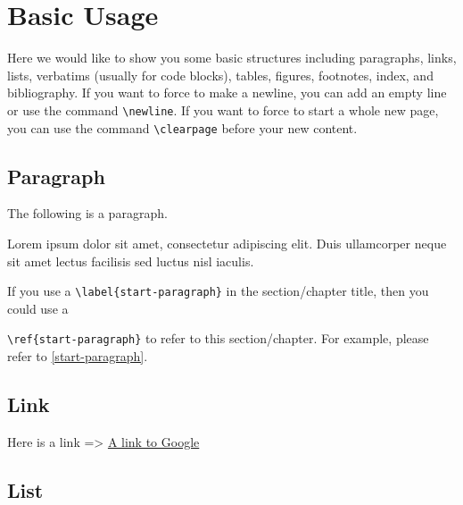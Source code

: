 \documentclass[10pt, a4paper, oneside]{article}
\begin{document}



\puredocTitleareaDate{\today}

\puredocTitleareaMaketitle[center]




\section{Basic Usage}\label{basic-usage}

Here we would like to show you some basic structures
including paragraphs, links, lists, verbatims (usually for code blocks),
tables, figures, footnotes, index, and bibliography.
If you want to force to make a newline, you can add an empty line or use the command \texttt{\textbackslash{}newline}.
If you want to force to start a whole new page, you can use the command \texttt{\textbackslash{}clearpage} before your new content.

\subsection{\texorpdfstring{Paragraph \label{start-paragraph}}{Paragraph }}\label{paragraph}

The following is a paragraph.

Lorem ipsum dolor sit amet, consectetur adipiscing elit.
Duis ullamcorper neque sit amet lectus facilisis sed luctus nisl iaculis.

If you use a \texttt{\textbackslash{}label\{start-paragraph\}} in the section/chapter title, then you could use a

\texttt{\textbackslash{}ref\{start-paragraph\}} to refer to this section/chapter.
For example, please refer to \ref{start-paragraph}.

\subsection{Link}\label{link}

Here is a link =\textgreater{} \href{https://www.google.com}{A link to Google}

\subsection{List}\label{list}
\end{document}
